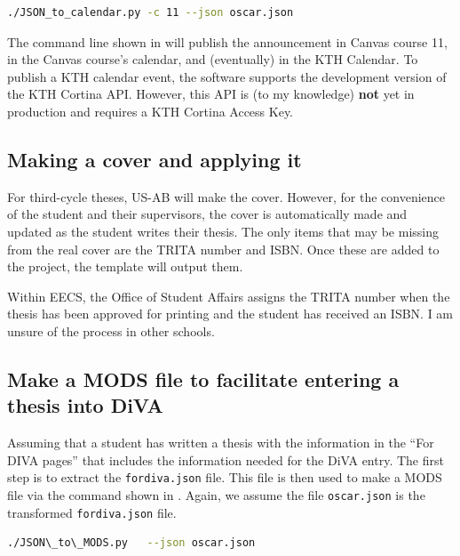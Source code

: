 \documentclass[12pt, twoside]{article}
\newcommand{\fname}[1]{\texttt{#1}}
\begin{document}
\begin{lstlisting}[language={bash}, caption={JSON\_to\_calendar.py for a transformed version of the fordiva.json file called oscar.json}, label=lst:jsonToCalenarforOscar1] 
./JSON_to_calendar.py -c 11 --json oscar.json
\end{lstlisting}
The command line shown in  will publish the announcement in \first Canvas course 11, \Second in the Canvas course’s calendar, and \third (eventually) in the \gls{KTH} Calendar. To publish a \gls{KTH} calendar event, the software supports the development version of the \gls{KTH} Cortina \gls{API}. However, this \gls{API} is (to my knowledge) \textbf{not} yet in production and requires a \gls{KTH} Cortina Access Key.


\subsection{Making a cover and applying it}
\label{sec:makingACover}
For third-cycle theses, US-AB will make the cover. However, for the convenience of the student and their supervisors, the cover is automatically made and updated as the student writes their thesis. The only items that may be missing from the real cover are the TRITA number and \gls{ISBN}. Once these are added to the project, the template will output them.

Within EECS, the Office of Student Affairs assigns the TRITA number when the thesis has been approved for printing and the student has received an \gls{ISBN}. I am unsure of the process in other schools.

\subsection{Make a MODS file to facilitate entering a thesis into DiVA}
\label{sec:facilitatingDiVAentry}
Assuming that a student has written a thesis with the information in the \enquote{For DIVA pages} that includes the information needed for the \gls{DiVA} entry. The first step is to extract the \fname{fordiva.json} file. This file is then used to make a \gls{MODS} file via the command shown in . Again, we assume the file \fname{oscar.json} is the transformed \fname{fordiva.json} file.
\begin{lstlisting}[language={bash}, caption={JSON\_to\_MODS.py for Oscar}, label=lst:jsonToMODSforOscar] 
./JSON\_to\_MODS.py   --json oscar.json
\end{lstlisting}
\end{document}
